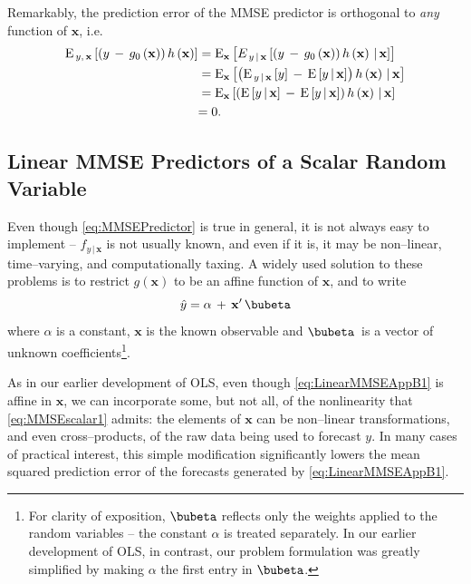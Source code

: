 \documentclass[graybox,envcountchap,sectrefs]{svmono}\usepackage[]{graphicx}\usepackage[]{xcolor}
\begin{document}
\begin{appendices}
Remarkably, the prediction error of the MMSE predictor is orthogonal
to \emph{any} function of $\mathbf{x}$, i.e.
\begin{align}
\mathrm{E}_{\,y,\,\mathrm{\mathbf{x}}}\left[\left(y\,-\,g_{0}\left(\mathrm{\mathbf{x}}\right)\right)h\left(\mathbf{x}\right)\right] & =\mathrm{E}_{\mathrm{\mathbf{x}}}\left[E_{\,y\,|\,\mathrm{\mathbf{x}}}\left[\left(y\,-\,g_{0}\left(\mathrm{\mathbf{x}}\right)\right)h\left(\mathbf{x}\right)\thinspace|\,\mathrm{\mathbf{x}}\right]\right]\nonumber \\
 & =\mathrm{E}_{\mathrm{\mathbf{x}}}\left[\left(\mathrm{E}_{\,y\,|\,\mathrm{\mathbf{x}}}\left[y\right]\,-\,\mathrm{E}\left[y\,|\,\mathrm{\mathbf{x}}\right]\right)h\left(\mathbf{x}\right)\thinspace|\,\mathrm{\mathbf{x}}\right]\nonumber \\
 & =\mathrm{E}_{\mathrm{\mathbf{x}}}\left[\left(\mathrm{E}\left[y\,|\,\mathrm{\mathbf{x}}\right]\,-\,\mathrm{E}\left[y\,|\,\mathrm{\mathbf{x}}\right]\right)h\left(\mathbf{x}\right)\thinspace|\,\mathrm{\mathbf{x}}\right]\nonumber \\
 & \mathrm{=0}.\label{eq:OrthogonalityPrinciple}
\end{align}


\subsection{Linear MMSE Predictors of a Scalar Random Variable\label{subsec:LinearMMSEScalar}}

Even though \eqref{eq:MMSEPredictor} is true in general, it is not
always easy to implement -- $f_{y\,|\,\mathrm{\mathbf{x}}}$ is not
usually known, and even if it is, it may be non--linear, time--varying,
and computationally taxing. A widely used solution to these problems
is to restrict $g\left(\mathrm{\mathbf{x}}\right)$ to be an affine
function of $\mathrm{\mathbf{x}}$, and to write
\begin{equation}
\hat{y}=\alpha\,+\,\mathrm{\mathbf{x}}^{\prime}\,\bubeta\label{eq:LinearMMSEAppB1}
\end{equation}
where $\alpha$ is a constant, $\mathbf{x}$ is the known observable
and $\bubeta$\ is a vector of unknown coefficients\footnote{For clarity of exposition, $\bubeta$ reflects only the weights applied
to the random variables -- the constant $\alpha$ is treated separately.
In our earlier development of OLS, in contrast, our problem formulation
was greatly simplified by making $\alpha$ the first entry in $\bubeta$.}.

As in our earlier development of OLS, even though \eqref{eq:LinearMMSEAppB1}
is affine in $\mathbf{x}$, we can incorporate some, but not all,
of the nonlinearity that \eqref{eq:MMSEscalar1} admits: the elements
of $\mathbf{x}$ can be non--linear transformations, and even cross--products,
of the raw data being used to forecast $y$. In many cases of practical
interest, this simple modification significantly lowers the mean squared
prediction error of the forecasts generated by \eqref{eq:LinearMMSEAppB1}.


\end{appendices}
\end{document}
